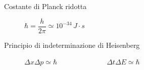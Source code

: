 \documentclass[a4paper,11pt,italian]{article}
\begin{document}
\begin{description}
  \item[Costante di Planck ridotta] 
  $ \hbar = \dfrac{h}{2 \pi} \simeq 10^{-34} \, J\cdot s $
  
  \item[Principio di indeterminazione di Heisenberg] $ \Delta x \Delta p \simeq \hbar $~~~~~~~~~~~~~~$ \Delta t \Delta E \simeq \hbar $
  
%   
%   
\end{description}
\end{document}
